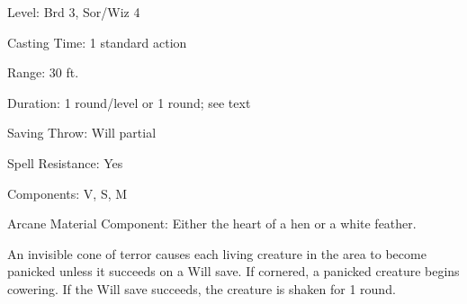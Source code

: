
\begin{description*}
\item[Level:] Brd 3, Sor/Wiz 4
\item[Casting Time:] 1 standard action
\item[Range:] 30 ft.
\item[Duration:] 1 round/level or 1 round; see text
\item[Saving Throw:] Will partial
\item[Spell Resistance:] Yes
\item[Components:] V, S, M
\item[Arcane Material Component:] Either the heart of a hen or a white feather.
\end{description*}

An invisible cone of terror causes each living creature in the area to become panicked
unless it succeeds on a Will save. If cornered, a panicked creature begins cowering.
If the Will save succeeds, the creature is shaken for 1 round.
